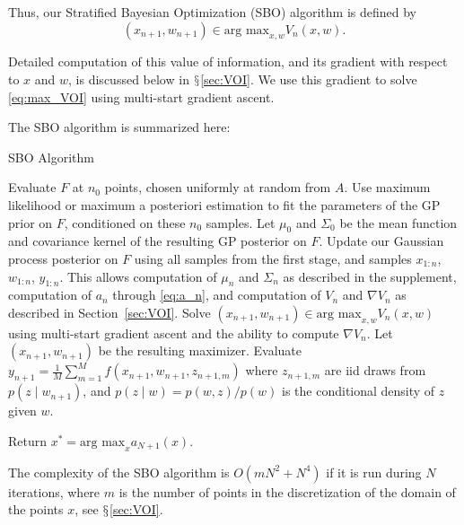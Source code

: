 \documentclass{article}
\newcommand{\w}{w}
\newcommand{\z}{z}
\begin{document}
Thus, our Stratified Bayesian Optimization (SBO) algorithm is defined by
\begin{equation}
    \left(x_{n+1},\w_{n+1}\right)\in\mbox{arg max}_{x,\w}V_{n}\left(x,\w\right).  \label{eq:max_VOI}
\end{equation}

Detailed computation of this value of information, and its gradient with respect to $x$ and $\w$, is discussed below in $\mathsection$\ref{sec:VOI}.  We use this gradient to solve \eqref{eq:max_VOI} using multi-start gradient ascent.

The SBO algorithm is summarized here:
\begin{algorithm}[!htb]
   \caption{SBO Algorithm}
   \label{alg:SBO}
\begin{algorithmic}[1]
	 Evaluate $F$ at $n_0$ points, chosen uniformly at random from $A$. 
   		Use maximum likelihood or maximum a posteriori estimation to fit the parameters of the GP prior on $F$, conditioned on these 				$n_0$ samples. Let $\mu_0$ and $\Sigma_0$ be the mean function and covariance kernel of the resulting GP posterior on $F$.
	\STATE Update our Gaussian process posterior on $F$ using all samples from the first stage, and samples $x_{1:n}$,$\w_{1:n}$,						$y_{1:n}$.  This allows computation of $\mu_n$ and $\Sigma_n$ as described in the supplement, computation of $a_{n}$ through 			\eqref{eq:a_n}, and computation of $V_{n}$ and $\nabla V_{n}$ as described in Section~\ref{sec:VOI}.
	\STATE Solve $\left(x_{n+1},\w_{n+1}\right)\in\mbox{arg max}_{x,\w}V_{n}\left(x,\w\right)$ using multi-start gradient ascent and the 		ability to compute $\nabla V_n$. Let $\left(x_{n+1},\w_{n+1}\right)$
		be the resulting maximizer.
	\STATE Evaluate $y_{n+1}=\frac{1}{M}\sum_{m=1}^{M}f\left(x_{n+1},\w_{n+1},\z_{n+1,m}\right)$
		where $\z_{n+1,m}$ are iid draws from  $p\left(\z\mid w_{n+1}\right)$,
		and $p(z\mid \w) = p(\w,\z)/p(\w)$ is the conditional density of $\z$ given $\w$.
	\ENDFOR

\STATE Return $x^{*}=\mbox{arg max}_{x}a_{N+1}\left(x\right).$
\end{algorithmic}
\end{algorithm}

The complexity of the SBO algorithm is $O(mN^2+N^4)$ if it is run during $N$ iterations, where $m$ is the number of points in the discretization of the domain of the points $x$, see $\mathsection$\ref{sec:VOI}.
\end{document}
